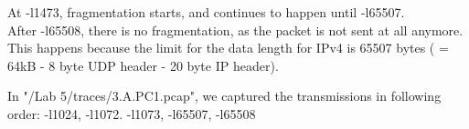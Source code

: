 At -l1473, fragmentation starts, and continues to happen until -l65507. \\ 
After -l65508, there is no fragmentation, as the packet is not sent at all anymore. \\
This happens because the limit for the data length for IPv4 is 65507 bytes ( = 64kB - 8 byte UDP header - 20 byte IP header).

In "/Lab 5/traces/3.A.PC1.pcap", we captured the transmissions in following order: -l1024, -l1072. -l1073, -l65507, -l65508
